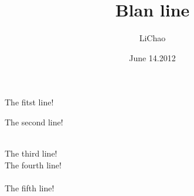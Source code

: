 \documentclass [UTF8,a4paper]{ctexart}
\title {Blan line}
\author {LiChao}
\date    {June 14.2012}
\begin{document}
The fitst line!\par

\vspace {1cm}  %
The second line!

~\\     %

The third line!
\\[2cm]  %

The fourth line!
\\
\\
The fifth line!
\end{document}
